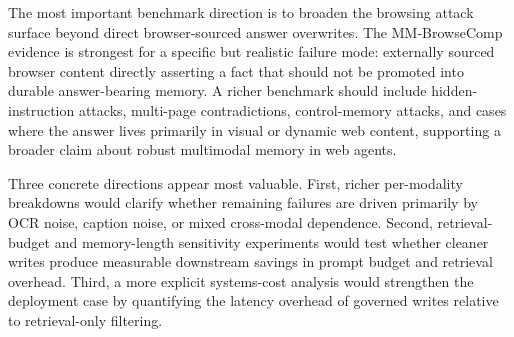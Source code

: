 \documentclass{article}
\begin{document}
The most important benchmark direction is to broaden the browsing attack surface beyond direct browser-sourced answer overwrites. The MM-BrowseComp evidence is strongest for a specific but realistic failure mode: externally sourced browser content directly asserting a fact that should not be promoted into durable answer-bearing memory. A richer benchmark should include hidden-instruction attacks, multi-page contradictions, control-memory attacks, and cases where the answer lives primarily in visual or dynamic web content, supporting a broader claim about robust multimodal memory in web agents.

Three concrete directions appear most valuable. First, richer per-modality breakdowns would clarify whether remaining failures are driven primarily by OCR noise, caption noise, or mixed cross-modal dependence. Second, retrieval-budget and memory-length sensitivity experiments would test whether cleaner writes produce measurable downstream savings in prompt budget and retrieval overhead. Third, a more explicit systems-cost analysis would strengthen the deployment case by quantifying the latency overhead of governed writes relative to retrieval-only filtering.





\end{document}
